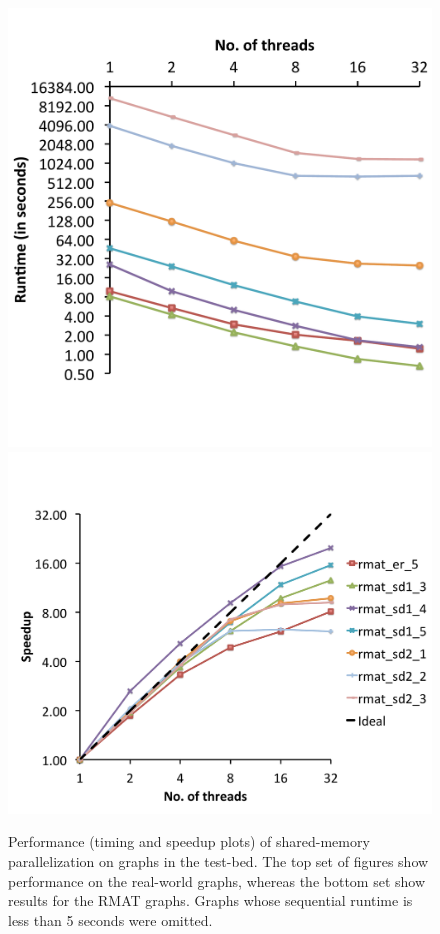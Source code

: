 \begin{figure}
    \includegraphics[scale=0.21]{parallel_other_timing.pdf}
    \includegraphics[scale=0.21]{parallel_other_speedup.pdf}
    
 \caption{Performance (timing and speedup plots) of shared-memory parallelization on graphs in the test-bed. The top set of figures show performance on the real-world graphs, whereas the bottom set show results for the RMAT graphs. Graphs whose sequential runtime is less than 5 seconds were omitted.}
\label{fig-parallel_perf}
\end{figure}


